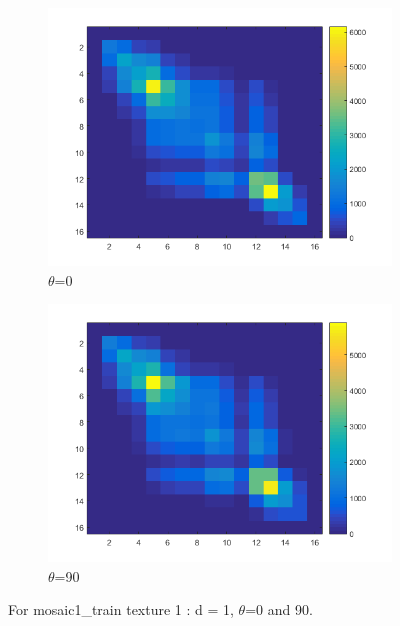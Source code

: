 \documentclass[a4paper, article, oneside, UKenglish]{memoir}
\newcommand{\0}{\mathbf{0}}
\newcommand{\1}{\mathbf{1}}
\begin{document}
\begin{figure}
  \centering
  \begin{subfigure}[b]{0.45\linewidth}
    \includegraphics[width=\linewidth]{./images/tx1-0.png}
    \caption{$\theta$=0}
  \end{subfigure}
  \begin{subfigure}[b]{0.45\linewidth}
    \includegraphics[width=\linewidth]{./images/tx1-90.png}
    \caption{$\theta$=90}
  \end{subfigure}
  \caption{For mosaic1\_train texture 1 : d = 1, $\theta$=0 and 90.}
  \label{fig:t1glcm}
\end{figure}
\end{document}
